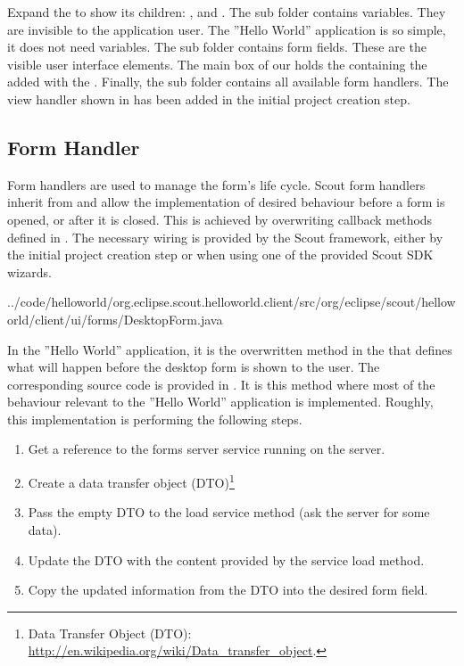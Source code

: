 \documentclass[a4paper,10pt,twoside]{book}
\begin{document}
Expand the  to show its children: ,  and .
The  sub folder contains variables. They are invisible to the application user.
The ''Hello World'' application is so simple, it does not need variables.
The sub folder  contains form fields. These are the visible user interface elements.
The main box of our  holds the  containing the  added with the .
Finally, the  sub folder contains all available form handlers.
The view handler shown in  has been added in the initial project creation step.

\subsection{Form Handler}

Form handlers are used to manage the form's life cycle.
Scout form handlers inherit from  and allow the implementation of desired behaviour before a form is opened, or after it is closed.
This is achieved by overwriting callback methods defined in .
The necessary wiring is provided by the Scout framework, either by the initial project creation step or when using one of the provided Scout SDK wizards.


{../code/helloworld/org.eclipse.scout.helloworld.client/src/org/eclipse/scout/helloworld/client/ui/forms/DesktopForm.java}

In the ''Hello World'' application, it is the overwritten  method in the  that defines what will happen before the desktop form is shown to the user.
The corresponding source code is provided in .
It is this  method where most of the behaviour relevant to the ''Hello World'' application is implemented.
Roughly, this implementation is performing the following steps.

\begin{enumerate}
  \item Get a reference to the forms server service running on the server.
  \item Create a data transfer object (DTO)\footnote{
Data Transfer Object (DTO): \url{http://en.wikipedia.org/wiki/Data_transfer_object}.}
  \item Pass the empty DTO to the load service method (ask the server for some data).
  \item Update the DTO with the content provided by the service load method.
  \item Copy the updated information from the DTO into the desired form field.
\end{enumerate}
\end{document}
